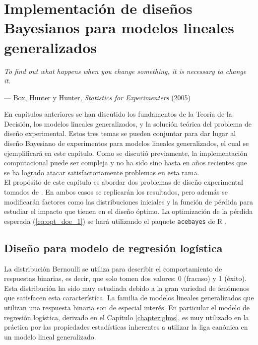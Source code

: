 \chapter[Implementación de diseños Bayesianos]{Implementación de diseños Bayesianos para modelos lineales generalizados} \label{chapter:doe_para_glms}

\epigraph{\textit{To find out what happens when you change something, it is necessary to change it.}}{--- Box, Hunter y Hunter, \textit{Statistics for Experimenters} (2005)}

En capítulos anteriores se han discutido los fundamentos de la Teoría de la Decisión, los modelos lineales generalizados, y la solución teórica del problema de diseño experimental. Estos tres temas se pueden conjuntar para dar lugar al diseño Bayesiano de experimentos para modelos lineales generalizados, el cual se ejemplificará en este capítulo. Como se discutió previamente, la implementación computacional puede ser compleja y no ha sido sino hasta en años recientes \citep{Woods_ACE} que se ha logrado atacar satisfactoriamente problemas en esta rama. \\


El propósito de este capítulo es abordar dos problemas de diseño experimental tomados de \cite{Woods_etal}. En ambos casos se replicarán los resultados, pero además se modificarán factores como las distribuciones iniciales y la función de pérdida para estudiar el impacto que tienen en el diseño óptimo. La optimización de la pérdida esperada (\ref{eq:opt_doe_1}) se hará utilizando el paquete \texttt{acebayes} de \textsf{R} \citep{acebayes}.




\section{Diseño para modelo de regresión logística}


La distribución Bernoulli se utiliza para describir el comportamiento de respuestas binarias, es decir, que solo tomen dos valores: 0 (fracaso) y 1 (éxito). Esta distribución ha sido muy estudiada debido a la gran variedad de fenómenos que satisfacen esta característica. La familia de modelos lineales generalizados que utilizan una respuesta binaria son de especial interés. En particular el modelo de regresión logística, derivado en el Capítulo \ref{chapter:glms}, es muy utilizado en la práctica por las propiedades estadísticas inherentes a utilizar la liga canónica en un modelo lineal generalizado. \\


